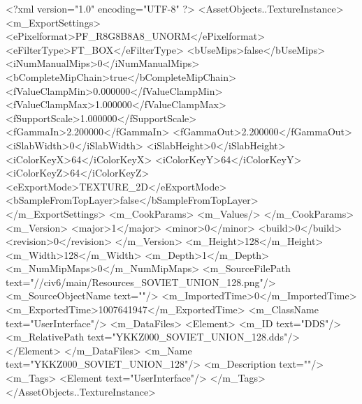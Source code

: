 <?xml version="1.0" encoding="UTF-8" ?>
<AssetObjects..TextureInstance>
	<m_ExportSettings>
		<ePixelformat>PF_R8G8B8A8_UNORM</ePixelformat>
		<eFilterType>FT_BOX</eFilterType>
		<bUseMips>false</bUseMips>
		<iNumManualMips>0</iNumManualMips>
		<bCompleteMipChain>true</bCompleteMipChain>
		<fValueClampMin>0.000000</fValueClampMin>
		<fValueClampMax>1.000000</fValueClampMax>
		<fSupportScale>1.000000</fSupportScale>
		<fGammaIn>2.200000</fGammaIn>
		<fGammaOut>2.200000</fGammaOut>
		<iSlabWidth>0</iSlabWidth>
		<iSlabHeight>0</iSlabHeight>
		<iColorKeyX>64</iColorKeyX>
		<iColorKeyY>64</iColorKeyY>
		<iColorKeyZ>64</iColorKeyZ>
		<eExportMode>TEXTURE_2D</eExportMode>
		<bSampleFromTopLayer>false</bSampleFromTopLayer>
	</m_ExportSettings>
	<m_CookParams>
		<m_Values/>
	</m_CookParams>
	<m_Version>
		<major>1</major>
		<minor>0</minor>
		<build>0</build>
		<revision>0</revision>
	</m_Version>
	<m_Height>128</m_Height>
	<m_Width>128</m_Width>
	<m_Depth>1</m_Depth>
	<m_NumMipMaps>0</m_NumMipMaps>
	<m_SourceFilePath text="//civ6/main/Resources_SOVIET_UNION_128.png"/>
	<m_SourceObjectName text=""/>
	<m_ImportedTime>0</m_ImportedTime>
	<m_ExportedTime>1007641947</m_ExportedTime>
	<m_ClassName text="UserInterface"/>
	<m_DataFiles>
		<Element>
			<m_ID text="DDS"/>
			<m_RelativePath text="YKKZ000_SOVIET_UNION_128.dds"/>
		</Element>
	</m_DataFiles>
	<m_Name text="YKKZ000_SOVIET_UNION_128"/>
	<m_Description text=""/>
	<m_Tags>
		<Element text="UserInterface"/>
	</m_Tags>
</AssetObjects..TextureInstance>

